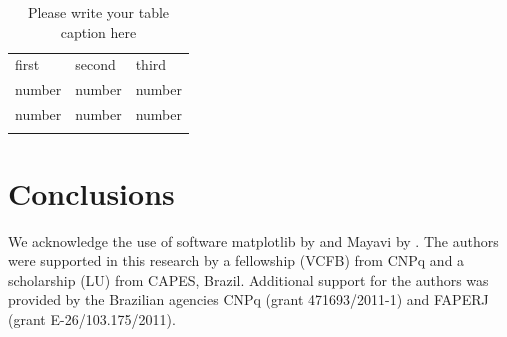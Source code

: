 \documentclass[twocolumn,final]{svjour3}
\begin{document}
\begin{table}
\caption{Please write your table caption here}
\label{tab:1}       %
\begin{tabular}{lll}
\hline\noalign{\smallskip}
first & second & third  \\
\noalign{\smallskip}\hline\noalign{\smallskip}
number & number & number \\
number & number & number \\
\noalign{\smallskip}\hline
\end{tabular}
\end{table}

\section{Conclusions}
\label{conclusions}

\begin{acknowledgements}
We acknowledge the use of software
matplotlib by \citet{matplotlib} and
Mayavi by \citet{mayavi}.
The authors were supported in this research by
a fellowship (VCFB) from CNPq
and a scholarship (LU) from CAPES, Brazil.
Additional support for the authors
was provided by the Brazilian agencies
CNPq (grant 471693/2011-1) and FAPERJ (grant E-26/103.175/2011).
\end{acknowledgements}
\end{document}
